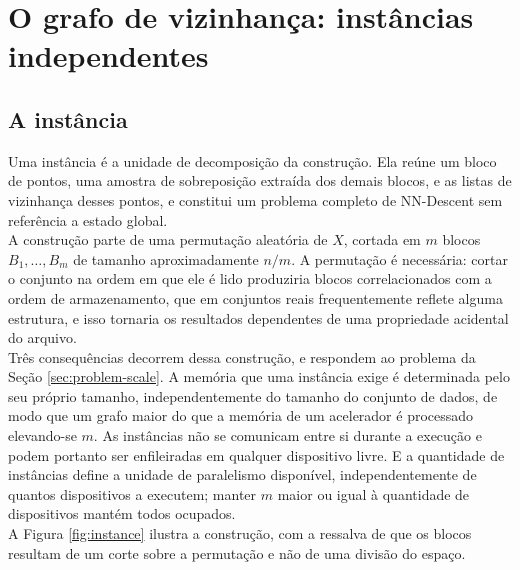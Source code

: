 \section{O grafo de vizinhança: instâncias independentes\label{sec:knn}}

\subsection{A instância\label{sec:instance}}

Uma instância é a unidade de decomposição da construção. Ela reúne um bloco de pontos, uma amostra de sobreposição extraída dos demais blocos, e as listas de vizinhança desses pontos, e constitui um problema completo de NN-Descent sem referência a estado global.\\

A construção parte de uma permutação aleatória de $X$, cortada em $m$ blocos $B_1, \dots, B_m$ de tamanho aproximadamente $n/m$. A permutação é necessária: cortar o conjunto na ordem em que ele é lido produziria blocos correlacionados com a ordem de armazenamento, que em conjuntos reais frequentemente reflete alguma estrutura, e isso tornaria os resultados dependentes de uma propriedade acidental do arquivo.\\

Três consequências decorrem dessa construção, e respondem ao problema da Seção \ref{sec:problem-scale}. A memória que uma instância exige é determinada pelo seu próprio tamanho, independentemente do tamanho do conjunto de dados, de modo que um grafo maior do que a memória de um acelerador é processado elevando-se $m$. As instâncias não se comunicam entre si durante a execução e podem portanto ser enfileiradas em qualquer dispositivo livre. E a quantidade de instâncias define a unidade de paralelismo disponível, independentemente de quantos dispositivos a executem; manter $m$ maior ou igual à quantidade de dispositivos mantém todos ocupados.\\

A Figura \ref{fig:instance} ilustra a construção, com a ressalva de que os blocos resultam de um corte sobre a permutação e não de uma divisão do espaço.\\

